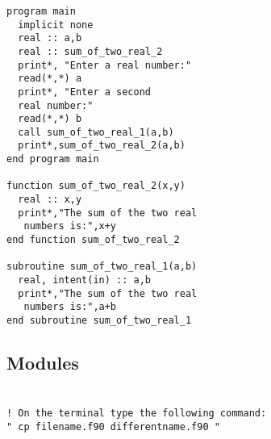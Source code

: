 \documentclass[twocolumn]{article}
\begin{document}
\subsubsection{}
\begin{verbatim}
program main
  implicit none
  real :: a,b
  real :: sum_of_two_real_2
  print*, "Enter a real number:"
  read(*,*) a
  print*, "Enter a second 
  real number:"
  read(*,*) b
  call sum_of_two_real_1(a,b)
  print*,sum_of_two_real_2(a,b)
end program main

function sum_of_two_real_2(x,y)
  real :: x,y
  print*,"The sum of the two real
   numbers is:",x+y
end function sum_of_two_real_2

subroutine sum_of_two_real_1(a,b)
  real, intent(in) :: a,b
  print*,"The sum of the two real
   numbers is:",a+b
end subroutine sum_of_two_real_1

\end{verbatim}
\subsection{Modules}

\subsubsection{}

\begin{verbatim}

! On the terminal type the following command:
" cp filename.f90 differentname.f90 "

\end{verbatim}
\end{document}
